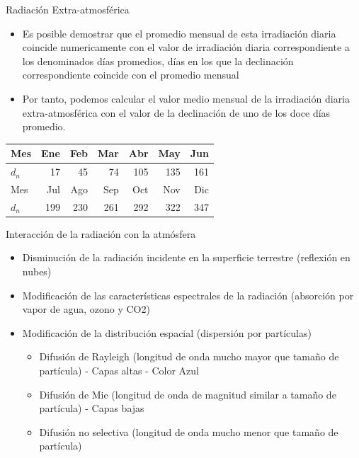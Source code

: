 \documentclass[xcolor={usenames,svgnames,dvipsnames}]{beamer}
\begin{document}
\begin{frame}[label=sec-1-0-3]{Radiación Extra-atmosférica}
\begin{itemize}
\item Es posible demostrar que el \alert{promedio mensual} de esta irradiación
diaria \alert{coincide numericamente} con el valor de irradiación diaria
correspondiente a los denominados \alert{días promedios}, días en los que
la declinación correspondiente coincide con el promedio mensual

\item Por tanto, podemos calcular el valor medio mensual de la irradiación
diaria extra-atmosférica con el valor de la declinación de uno de los
doce días promedio.
\end{itemize}

\begin{center}
\begin{tabular}{lrrrrrr}
Mes & Ene & Feb & Mar & Abr & May & Jun\\
\hline
$d_n$ & 17 & 45 & 74 & 105 & 135 & 161\\
\hline
Mes & Jul & Ago & Sep & Oct & Nov & Dic\\
\hline
$d_n$ & 199 & 230 & 261 & 292 & 322 & 347\\
\end{tabular}
\end{center}
\end{frame}

\begin{frame}[label=sec-1-0-4]{Interacción de la radiación con la atmósfera}
\begin{itemize}
\item \alert{Disminución} de la radiación incidente en la superficie terrestre
(reflexión en nubes)

\item \alert{Modificación de las características espectrales} de la radiación
(absorción por vapor de agua, ozono y CO2)

\item \alert{Modificación de la distribución espacial} (dispersión por
partículas)

\begin{itemize}
\item Difusión de Rayleigh (longitud de onda mucho mayor que tamaño de
partícula) - Capas altas - Color Azul

\item Difusión de Mie (longitud de onda de magnitud similar a tamaño de
partícula) - Capas bajas

\item Difusión no selectiva (longitud de onda mucho menor que tamaño de
partícula)
\end{itemize}
\end{itemize}
\end{frame}
\end{document}
